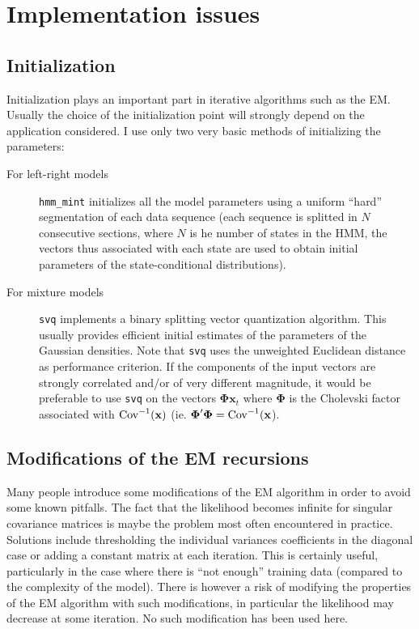 \documentclass[a4paper,11pt]{article}
\begin{document}
\section{Implementation issues}
\subsection{Initialization}
Initialization plays an important part in iterative algorithms such as the EM. Usually the choice of the initialization point will strongly depend on the application considered. I use only two very basic methods of initializing the parameters:
\begin{description}
\item [For left-right models] \verb:hmm_mint: initializes all the model parameters using a uniform ``hard'' segmentation of each data sequence (each sequence is splitted in $N$ consecutive sections, where $N$ is he number of states in the HMM, the vectors thus associated with each state are used to obtain initial parameters of the state-conditional distributions).
\item [For mixture models] \verb:svq: implements a binary splitting vector quantization algorithm. This usually provides efficient initial estimates of the parameters of the Gaussian densities. Note that \verb:svq: uses the unweighted Euclidean distance as performance criterion. If the components of the input vectors are strongly correlated and/or of very different magnitude, it would be preferable to use \verb:svq: on the vectors $\boldsymbol{\Phi} \mathbf{x}_t$ where $\boldsymbol{\Phi}$ is the Cholevski factor associated with ${\rm Cov}^{-1}(\mathbf{x})$ (ie. $\boldsymbol{\Phi}'\boldsymbol{\Phi} = {\rm Cov}^{-1}(\mathbf{x}$).
\end{description}

\subsection{Modifications of the EM recursions}
Many people introduce some modifications of the EM algorithm in order to avoid some known pitfalls. The fact that the likelihood becomes infinite for singular covariance matrices is maybe the problem most often encountered in practice. Solutions include thresholding the individual variances coefficients in the diagonal case or adding a constant matrix at each iteration. This is certainly useful, particularly in the case where there is ``not enough'' training data (compared to the complexity of the model). There is however a risk of modifying the properties of the EM algorithm with such modifications, in particular the likelihood may decrease at some iteration.
 No such modification has been used here.
\end{document}
